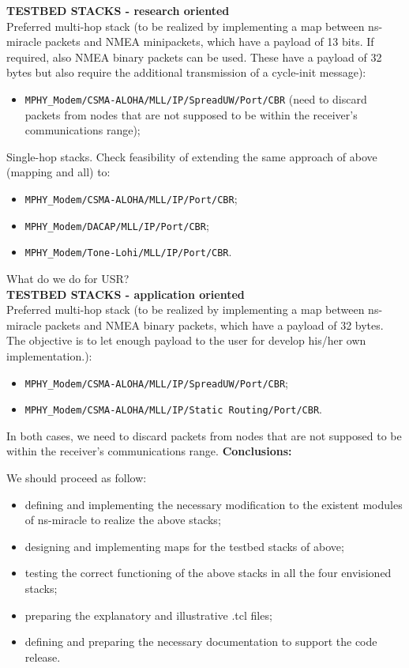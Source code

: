 \documentclass[11pt,journal,draftclsnofoot,onecolumn,twoside,letterpaper]{IEEEtran}
\theoremstyle{definition} \newtheorem{definition}[]{Definition}
\theoremstyle{theorem} \newtheorem{theorem}[]{Theorem}
\begin{document}
{\bf TESTBED STACKS - research oriented}\\
Preferred multi-hop stack (to be realized by implementing a map between ns-miracle packets and NMEA minipackets, which have a payload of 13 bits. If required, also NMEA binary packets can be used. These have a payload of 32 bytes but also require the additional transmission of a cycle-init message):
\begin{itemize}
 \item {\tt MPHY\_Modem/CSMA-ALOHA/MLL/IP/SpreadUW/Port/CBR} (need to discard packets from nodes that are not supposed to be within the receiver’s communications range);
\end{itemize}
Single-hop stacks. Check feasibility of extending the same approach of above (mapping and all) to:
\begin{itemize}
 \item {\tt MPHY\_Modem/CSMA-ALOHA/MLL/IP/Port/CBR};
 \item {\tt MPHY\_Modem/DACAP/MLL/IP/Port/CBR};
 \item {\tt MPHY\_Modem/Tone-Lohi/MLL/IP/Port/CBR}.
\end{itemize}
What do we do for USR?\\
{\bf TESTBED STACKS - application oriented}\\
Preferred multi-hop stack (to be realized by implementing a map between ns-miracle packets and NMEA binary packets, which have a payload of 32 bytes. The objective is to let enough payload to the user for develop his/her own implementation.):
\begin{itemize}
 \item {\tt MPHY\_Modem/CSMA-ALOHA/MLL/IP/SpreadUW/Port/CBR};
 \item {\tt MPHY\_Modem/CSMA-ALOHA/MLL/IP/Static Routing/Port/CBR}.
\end{itemize}
In both cases, we need to discard packets from nodes that are not supposed to be within the receiver's communications range.
{\bf Conclusions:}

We should proceed as follow:
\begin{itemize}
 \item defining and implementing the necessary modification to the existent modules of ns-miracle to realize the above stacks;
 \item designing and implementing maps for the testbed stacks of above;
 \item testing the correct functioning of the above stacks in all the four envisioned stacks;
 \item preparing the explanatory and illustrative .tcl files;
 \item defining and preparing the necessary documentation to support the code release.  
\end{itemize}
\end{document}
